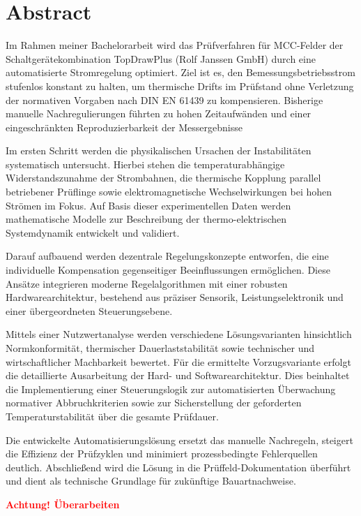 
\section*{Abstract}


Im Rahmen meiner Bachelorarbeit wird das Prüfverfahren für MCC-Felder der Schaltgerätekombination TopDrawPlus (Rolf Janssen GmbH) durch eine automatisierte Stromregelung optimiert. Ziel ist es, den Bemessungsbetriebsstrom stufenlos konstant zu halten, um thermische Drifts im Prüfstand ohne Verletzung der normativen Vorgaben nach DIN EN 61439 zu kompensieren. Bisherige manuelle Nachregulierungen führten zu hohen Zeitaufwänden und einer eingeschränkten Reproduzierbarkeit der Messergebnisse

Im ersten Schritt werden die physikalischen Ursachen der Instabilitäten systematisch untersucht. Hierbei stehen die temperaturabhängige Widerstandszunahme der Strombahnen, die thermische Kopplung parallel betriebener Prüflinge sowie elektromagnetische Wechselwirkungen bei hohen Strömen im Fokus. Auf Basis dieser experimentellen Daten werden mathematische Modelle zur Beschreibung der thermo-elektrischen Systemdynamik entwickelt und validiert.

Darauf aufbauend werden dezentrale Regelungskonzepte entworfen, die eine individuelle Kompensation gegenseitiger Beeinflussungen ermöglichen. Diese Ansätze integrieren moderne Regelalgorithmen mit einer robusten Hardwarearchitektur, bestehend aus präziser Sensorik, Leistungselektronik und einer übergeordneten Steuerungsebene.

Mittels einer Nutzwertanalyse werden verschiedene Lösungsvarianten hinsichtlich Normkonformität, thermischer Dauerlaststabilität sowie technischer und wirtschaftlicher Machbarkeit bewertet. Für die ermittelte Vorzugsvariante erfolgt die detaillierte Ausarbeitung der Hard- und Softwarearchitektur. Dies beinhaltet die Implementierung einer Steuerungslogik zur automatisierten Überwachung normativer Abbruchkriterien sowie zur Sicherstellung der geforderten Temperaturstabilität über die gesamte Prüfdauer.

Die entwickelte Automatisierungslösung ersetzt das manuelle Nachregeln, steigert die Effizienz der Prüfzyklen und minimiert prozessbedingte Fehlerquellen deutlich. Abschließend wird die Lösung in die Prüffeld-Dokumentation überführt und dient als technische Grundlage für zukünftige Bauartnachweise.



\textcolor{red}{\textbf{Achtung! Überarbeiten}}